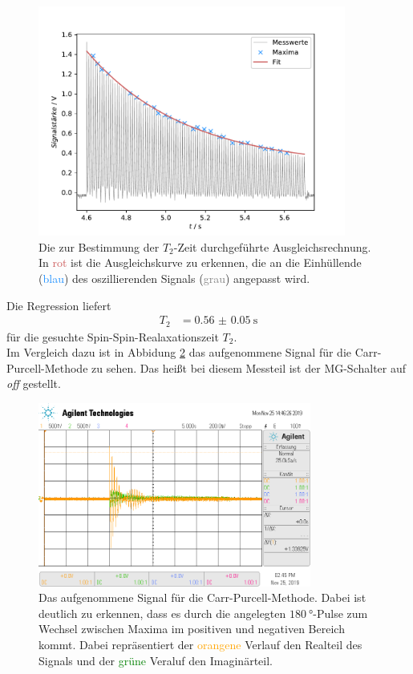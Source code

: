 \begin{figure}[H]
  \centering
  \includegraphics[width=0.9\textwidth]{../Auswertung/T2_fit.pdf}
  \caption{Die zur Bestimmung der $T_2$-Zeit durchgeführte Ausgleichsrechnung. In \textcolor{indianred}{rot} ist die Ausgleichskurve zu erkennen,
  die an die Einhüllende (\textcolor{dodgerblue}{blau}) des oszillierenden Signals (\textcolor{gray}{grau}) angepasst wird.}
  \label{fig:T2_fit}
\end{figure} \noindent
Die Regression liefert
\begin{align*}
  T_2 &=  \SI{0.56(005)}{\second}
\end{align*}
für die gesuchte Spin-Spin-Realaxationszeit $T_2$. \\
Im Vergleich dazu ist in Abbidung \ref{fig:t2_off} das aufgenommene Signal für die Carr-Purcell-Methode zu sehen. Das heißt bei diesem
Messteil ist der MG-Schalter auf \textit{off} gestellt.
\begin{figure}[H]
  \centering
  \includegraphics[width=0.8\textwidth]{../data/scope_76.png}
  \caption{Das aufgenommene Signal für die Carr-Purcell-Methode. Dabei ist deutlich zu erkennen, dass es durch die angelegten
  $\SI{180}{\degree}$-Pulse zum Wechsel zwischen Maxima im positiven und negativen Bereich kommt. Dabei repräsentiert der \textcolor{orange}{orangene} 
  Verlauf den Realteil des Signals und der \textcolor{green}{grüne} Veraluf den Imaginärteil.}
  \label{fig:t2_off}
\end{figure} \noindent
